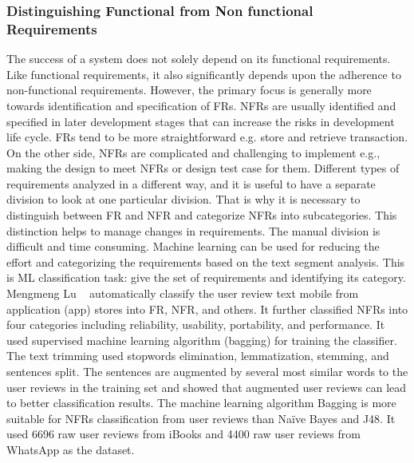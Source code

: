 \subsubsection{Distinguishing Functional from Non functional Requirements}

The success of a system does not solely depend on its functional requirements.
Like functional requirements, it also significantly depends upon the adherence
to non-functional requirements. However, the primary focus is generally more
towards identification and specification of FRs. NFRs are usually identified and
specified in later development stages that can increase the risks in development
life cycle. FRs tend to be more straightforward e.g. store and retrieve
transaction. On the other side, NFRs are complicated and challenging to
implement e.g., making the design to meet NFRs or design test case for them.
Different types of requirements analyzed in a different way, and it is useful to
have a separate division to look at one particular division. That is why it is
necessary to distinguish between FR and NFR and categorize NFRs into
subcategories. This distinction helps to manage changes in requirements. The
manual division is difficult and time consuming. Machine learning can be used
for reducing the effort and categorizing the requirements based on the text
segment analysis. This is ML classification task: give the set of requirements
and identifying its category.\\

	Mengmeng Lu \etal~ \cite{Lu:2017} automatically classify the user review text
mobile from application (app) stores  into FR, NFR, and others. It further
classified NFRs into four categories including reliability, usability,
portability, and performance. It used supervised machine learning algorithm
(bagging) for training the classifier. The text trimming used stopwords
elimination, lemmatization, stemming, and sentences split. The sentences are augmented by several most similar words to the user reviews in the training set and showed that augmented user reviews can lead to better classification results. 
The machine learning algorithm Bagging is more suitable for NFRs classification from user reviews than Naïve Bayes and J48. It used 6696 raw user reviews from iBooks and 
4400 raw user reviews from WhatsApp as the dataset.\\

